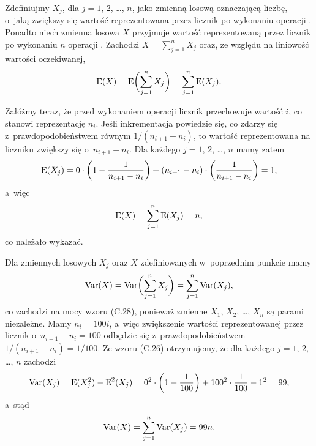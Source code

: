 \problems


\subproblem %
Zdefiniujmy $X_j$, dla $j=1$, 2, \dots, $n$, jako zmienną losową oznaczającą liczbę, o~jaką zwiększy się wartość reprezentowana przez licznik po  wykonaniu operacji .
Ponadto niech zmienna losowa $X$ przyjmuje wartość reprezentowaną przez licznik po wykonaniu $n$ operacji .
Zachodzi $X=\sum_{j=1}^nX_j$ oraz, ze względu na liniowość wartości oczekiwanej,
\[
	\operatorname{E}(X) = \operatorname{E}\biggl(\sum_{j=1}^nX_j\biggr) = \sum_{j=1}^n\operatorname{E}(X_j).
\]

Załóżmy teraz, że przed wykonaniem  operacji  licznik przechowuje wartość $i$, co stanowi reprezentację $n_i$.
Jeśli inkrementacja powiedzie się, co zdarzy się z~prawdopodobieństwem równym $1/(n_{i+1}-n_i)$, to wartość reprezentowana na liczniku zwiększy się o~$n_{i+1}-n_i$.
Dla każdego $j=1$, 2, \dots, $n$ mamy zatem
\[
	\operatorname{E}(X_j) = 0\cdot\biggl(1-\frac{1}{n_{i+1}-n_i}\biggr)+(n_{i+1}-n_i)\cdot\biggl(\frac{1}{n_{i+1}-n_i}\biggr) = 1,
\]
a~więc
\[
	\operatorname{E}(X) = \sum_{j=1}^n\operatorname{E}(X_j) = n,
\]
co należało wykazać.

\subproblem %
Dla zmiennych losowych $X_j$ oraz $X$ zdefiniowanych w~poprzednim punkcie mamy
\[
	\operatorname{Var}(X) = \operatorname{Var}\biggl(\sum_{j=1}^nX_j\biggr) = \sum_{j=1}^n\operatorname{Var}(X_j),
\]
co zachodzi na mocy wzoru (C.28), ponieważ zmienne $X_1$, $X_2$, \dots, $X_n$ są parami niezależne.
Mamy $n_i=100i$, a~więc zwiększenie wartości reprezentowanej przez licznik o~$n_{i+1}-n_i=100$ odbędzie się z~prawdopodobieństwem $1/(n_{i+1}-n_i)=1/100$.
Ze wzoru (C.26) otrzymujemy, że dla każdego $j=1$, 2, \dots, $n$ zachodzi
\[
	\operatorname{Var}(X_j) = \operatorname{E}(X_j^2)-\operatorname{E}^2(X_j) = 0^2\cdot\biggl(1-\frac{1}{100}\biggr)+100^2\cdot\frac{1}{100}-1^2 = 99,
\]
a~stąd
\[
	\operatorname{Var}(X) = \sum_{j=1}^n\operatorname{Var}(X_j) = 99n.
\]


